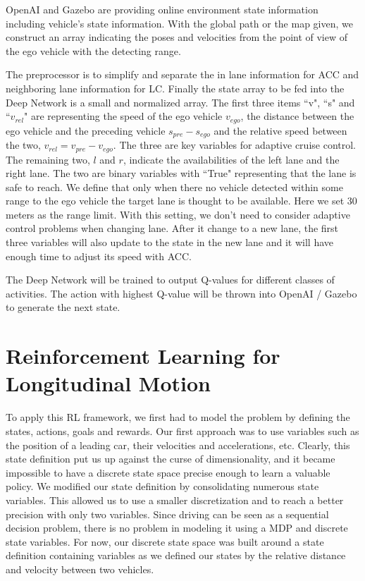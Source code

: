 OpenAI and Gazebo are providing online environment state information including vehicle's state information. With the global path or the map given, we construct an array indicating the poses and velocities from the point of view of the ego vehicle with the detecting range.

The preprocessor is to simplify and separate the in lane information for ACC and neighboring lane information for LC. Finally the state array to be fed into the Deep Network is a small and normalized array. The first three items ``v", ``s" and ``$v_{rel}$" are representing the speed of the ego vehicle $v_{ego}$, the distance between the ego vehicle and the preceding vehicle $s_{pre} - s_{ego}$ and the relative speed between the two, $v_{rel} = v_{pre} - v_{ego}$. The three are key variables for adaptive cruise control. The remaining two, $l$ and $r$, indicate the availabilities of the left lane and the right lane. The two are binary variables with ``True" representing that the lane is safe to reach. We define that only when there no vehicle detected within some range to the ego vehicle the target lane is thought to be available. Here we set 30 meters as the range limit. With this setting, we don't need to consider adaptive control problems when changing lane. After it change to a new lane, the first three variables will also update to the state in the new lane and it will have enough time to adjust its speed with ACC.

The Deep Network will be trained to output Q-values for different classes of activities. The action with highest Q-value will be thrown into OpenAI / Gazebo to generate the next state.

\section{Reinforcement Learning for Longitudinal Motion}

To apply this RL framework, we first had to model the problem by defining the states, actions, goals and rewards. Our first approach was to use variables such as the position of a leading car, their velocities and accelerations, etc. Clearly, this state definition put us up against the curse of dimensionality, and it became impossible to have a discrete state space precise enough to learn a valuable policy. We modified our state definition by consolidating numerous state variables. This allowed us to use a smaller discretization and to reach a better precision with only two variables. Since driving can be seen as a sequential decision problem, there is no problem in modeling it using a MDP and discrete state variables. For now, our discrete state space was built around a state definition containing variables as we defined our states by the relative distance and velocity between two vehicles.

